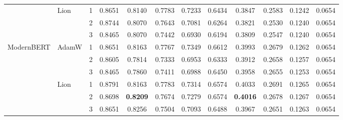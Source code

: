 \begin{table}[t]
\begin{tabular}{llcccccccccc}
\cmidrule{2-12}
 & \multirow{3}{*}{Lion} 
 & 1 & 0.8651 & 0.8140 & 0.7783 & 0.7233 & 0.6434 & 0.3847 & 0.2583 & 0.1242 & 0.0654 \\
 & & 2 & 0.8744 & 0.8070 & 0.7643 & 0.7081 & 0.6264 & 0.3821 & 0.2530 & 0.1240 & 0.0654 \\
 & & 3 & 0.8465 & 0.8070 & 0.7442 & 0.6930 & 0.6194 & 0.3809 & 0.2547 & 0.1240 & 0.0654 \\
\midrule
\multirow{6}{*}{ModernBERT} & \multirow{3}{*}{AdamW} 
 & 1 & 0.8651 & 0.8163 & 0.7767 & 0.7349 & 0.6612 & 0.3993 & 0.2679 & 0.1262 & 0.0654\\
 & & 2 & 0.8605 & 0.7814 & 0.7333 & 0.6953 & 0.6333 & 0.3912 & 0.2658 & 0.1257 & 0.0654 \\
 & & 3 & 0.8465 & 0.7860 & 0.7411 & 0.6988 & 0.6450 & 0.3958 & 0.2655 & 0.1253 & 0.0654 \\
\cmidrule{2-12}
 & \multirow{3}{*}{Lion} 
 & 1 & 0.8791 & 0.8163 & 0.7783 & 0.7314 & 0.6574 & 0.4033 & 0.2691 & 0.1265 & 0.0654\\
 & & 2 & 0.8698 & \textbf{0.8209} & 0.7674 & 0.7279 & 0.6574 & \textbf{0.4016} & 0.2678 & 0.1267 & 0.0654\\
 & & 3 & 0.8651 & 0.8256 & 0.7504 & 0.7093 & 0.6488 & 0.3967 & 0.2651 & 0.1263 & 0.0654 \\
\bottomrule
\end{tabular}
\end{table}


